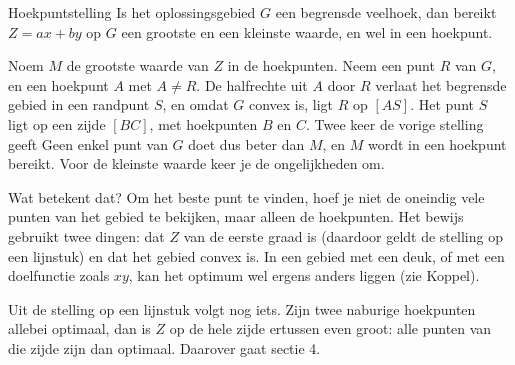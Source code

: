 \begin{theorie}
\begin{minipage}[t]{.64\linewidth}
\vspace{0pt}
\begin{stelling}{Hoekpuntstelling}
Is het oplossingsgebied $G$ een begrensde veelhoek, dan bereikt $Z = ax + by$ op $G$ een grootste en een kleinste waarde, en wel in een hoekpunt.
\end{stelling}

\begin{bewijs}
Noem $M$ de grootste waarde van $Z$ in de hoekpunten. Neem een punt $R$ van $G$, en een hoekpunt $A$ met $A \neq R$. De halfrechte uit $A$ door $R$ verlaat het begrensde gebied in een randpunt $S$, en omdat $G$ convex is, ligt $R$ op $[AS]$. Het punt $S$ ligt op een zijde $[BC]$, met hoekpunten $B$ en $C$. Twee keer de vorige stelling geeft
Geen enkel punt van $G$ doet dus beter dan $M$, en $M$ wordt in een hoekpunt bereikt. Voor de kleinste waarde keer je de ongelijkheden om.
\end{bewijs}
\end{minipage}\hfill
\begin{minipage}[t]{.32\linewidth}
\vspace{0pt}
\centering
{}
\end{minipage}
\end{theorie}

Wat betekent dat? Om het beste punt te vinden, hoef je niet de oneindig vele punten van het gebied te bekijken, maar alleen de hoekpunten. Het bewijs gebruikt twee dingen: dat $Z$ van de eerste graad is (daardoor geldt de stelling op een lijnstuk) en dat het gebied convex is. In een gebied met een deuk, of met een doelfunctie zoals $xy$, kan het optimum wel ergens anders liggen (zie Koppel).

Uit de stelling op een lijnstuk volgt nog iets. Zijn twee naburige hoekpunten allebei optimaal, dan is $Z$ op de hele zijde ertussen even groot: alle punten van die zijde zijn dan optimaal. Daarover gaat sectie 4.

